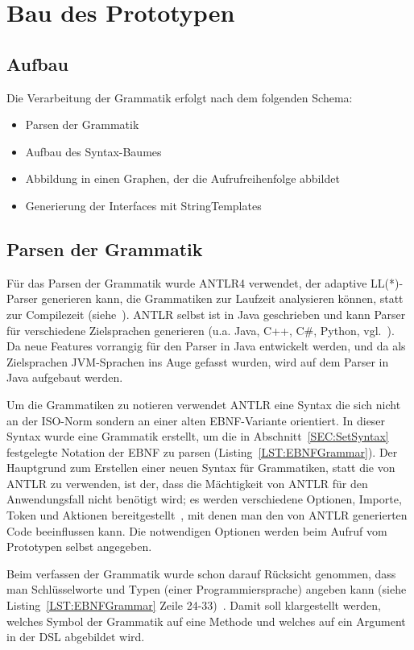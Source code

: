 \documentclass[../InterneDSLs.tex]{subfiles}
\begin{document}
\chapter{Bau des Prototypen}\label{SEC:Prototype}

\section{Aufbau}
Die Verarbeitung der Grammatik erfolgt nach dem folgenden Schema:
\begin{itemize}
	\item Parsen der Grammatik
	\item Aufbau des Syntax-Baumes
	\item Abbildung in einen Graphen, der die Aufrufreihenfolge abbildet
	\item Generierung der Interfaces mit StringTemplates
\end{itemize}

\section{Parsen der Grammatik}
Für das Parsen der Grammatik wurde ANTLR4 verwendet, der adaptive LL(*)-Parser generieren kann, die Grammatiken zur Laufzeit analysieren können, statt zur Compilezeit (siehe~\cite[S. xiii ff]{Parr.2012}). ANTLR selbst ist in Java geschrieben und kann Parser für verschiedene Zielsprachen generieren (u.a. Java, C++, C\#, Python, vgl.~\cite{antlrcodegeneration.github}). Da neue Features vorrangig für den Parser in Java entwickelt werden, und da als Zielsprachen JVM-Sprachen ins Auge gefasst wurden, wird auf dem Parser in Java aufgebaut werden.

Um die Grammatiken zu notieren verwendet ANTLR eine Syntax die sich nicht an der ISO-Norm sondern an einer alten EBNF-Variante orientiert. In dieser Syntax wurde eine Grammatik erstellt, um die in Abschnitt~\ref{SEC:SetSyntax} festgelegte Notation der EBNF zu parsen (Listing~\ref{LST:EBNFGrammar}). Der Hauptgrund zum Erstellen einer neuen Syntax für Grammatiken, statt die von ANTLR zu verwenden, ist der, dass die Mächtigkeit von ANTLR für den Anwendungsfall nicht benötigt wird; es werden verschiedene Optionen, Importe, Token und Aktionen bereitgestellt~\cite[S. 265ff]{Parr.2012}, mit denen man den von ANTLR generierten Code beeinflussen kann. Die notwendigen Optionen werden beim Aufruf vom Prototypen selbst angegeben.

Beim verfassen der Grammatik wurde schon darauf Rücksicht genommen, dass man Schlüsselworte und Typen (einer Programmiersprache) angeben kann (siehe Listing~\ref{LST:EBNFGrammar} Zeile 24-33)~\cite{FluentAPI.lukaseder}. Damit soll klargestellt werden, welches Symbol der Grammatik auf eine Methode und welches auf ein Argument in der DSL abgebildet wird.
\end{document}
